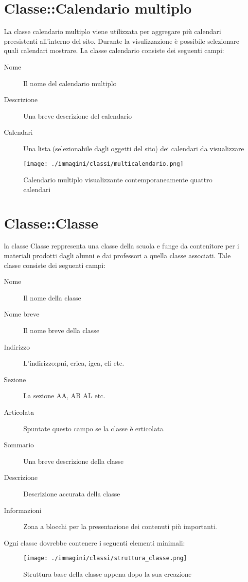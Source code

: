 \section{Classe::Calendario multiplo}
La classe calendario multiplo viene utilizzata per aggregare più calendari preesistenti all'interno del sito. Durante la visulizzazione è possibile selezionare quali calendari mostrare. La classe calendario consiste dei seguenti campi:
\begin{description}
 \item[Nome]Il nome del calendario multiplo
\item[Descrizione] Una breve descrizione del calendario
\item[Calendari] Una lista (selezionabile  dagli oggetti del sito) dei calendari da visualizzare
\end{description}
\begin{figure}[H]
 \centering
 \texttt{[image: ./immagini/classi/multicalendario.png]}
 \caption{Calendario multiplo visualizzante contemporaneamente quattro calendari}
 \label{fig:multical}
\end{figure}

\section{Classe::Classe}
la classe Classe reppresenta una classe della scuola e funge da contenitore per i materiali prodotti dagli alunni e dai professori a quella classe associati. Tale classe consiste dei seguenti campi:
\begin{description}
\item[Nome] Il nome della classe
\item[Nome breve] Il nome breve della classe
\item[Indirizzo] L'indirizzo:pni, erica, igea, eli etc.
\item[Sezione]La sezione AA, AB AL etc.
\item[Articolata] Spuntate questo campo se la classe è erticolata
\item[Sommario] Una breve descrizione della classe
\item[Descrizione] Descrizione accurata della classe
\item[Informazioni] Zona a blocchi per la presentazione dei contenuti più importanti.
\end{description}
Ogni classe dovrebbe contenere i seguenti elementi minimali:
\begin{figure}[H]
 \centering
 \texttt{[image: ./immagini/classi/struttura\_classe.png]}
 \caption{Struttura base della classe appena dopo la sua creazione}
 \label{fig:strut_class}
\end{figure}

